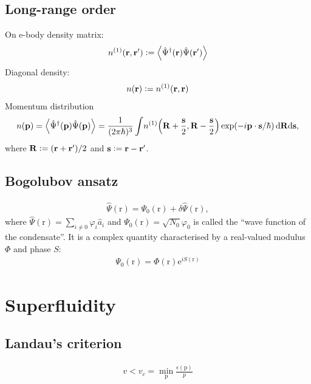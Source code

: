 \documentclass[11pt,a4paper,twoside]{article}
\renewcommand{\vec}[1]{\bm{\mathrm{#1}}}
\begin{document}
	\subsection{Long-range order}
		On	e-body density matrix:
		\begin{align}
			n^{(1)}(\vec{r},\vec{r}') \vcentcolon=\expval{\hat{\Psi}^\dagger(\vec{r})\hat{\Psi}(\vec{r}')}
		\end{align}
		Diagonal density:
		\begin{align}
			n(\vec{r})\vcentcolon  = n^{(1)}(\vec{r},\vec{r})
		\end{align}
		Momentum distribution
		\begin{align}
			n(\vec{p}) = \expval{\hat{\Psi}^\dagger(\vec{p})\hat{\Psi}(\vec{p})} = \frac{1}{(2\pi\hbar)^3}\int \! n^{(1)}\qty(\vec{R}+\frac{\vec{s}}{2},\vec{R}-\frac{\vec{s}}{2})\exp(-i\vec{p}\cdot\vec{s}/\hbar)\,\mathrm{d}\vec{R}\mathrm{d}\vec{s},
		\end{align}
		where $\vec{R}\vcentcolon=(\vec{r}+\vec{r}')/2$ and $\vec{s}\vcentcolon=\vec{r}-\vec{r}'$.
	
	\subsection{Bogolubov ansatz}
	\begin{align}
		\hat{\Psi}(\vec{r})=\Psi_0(\vec{r})+\delta\hat{\Psi}(\vec{r}),
	\end{align}
	where $\hat{\Psi}(\vec{r})=\sum_{i\neq 0}\varphi_i\hat{a}_i$ and $\Psi_0(\vec{r})=\sqrt{N_0}\varphi_0$ is called the ``wave function of the condensate''. It is a complex quantity characterised by a real-valued modulus $\Phi$ and phase $S$:
	\begin{align}
		\Psi_0(\vec{r}) = \Phi(\vec{r})\mathrm{e}^{iS(\vec{r})}
	\end{align}
	
	\section{Superfluidity}
		\subsection{Landau's criterion}
			\begin{align}
				v<v_c = \min_{\vec{p}}\frac{\epsilon(\vec{p})}{p}
			\end{align}
			
\end{document}
